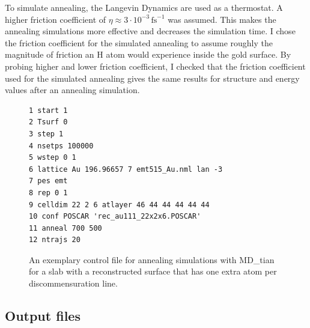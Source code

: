 \documentclass[twoside, 11pt, titlepage, captions=nooneline, a4paper, headsepline]{scrbook}%
\newcommand{\9}{\mathrm}
\newcommand{\0}{\,\mathrm}
\begin{document}
To simulate annealing, the Langevin Dynamics are used as a thermostat. A higher friction coefficient of $\eta \approx 3\cdot10^{-3}$\,$\mathrm{fs}^{-1}$ was assumed. This makes the annealing simulations more effective and decreases the simulation time. I chose the friction coefficient for the simulated annealing to assume roughly the magnitude of friction an H atom would experience inside the gold surface. By probing higher and lower friction coefficient, I checked that the friction coefficient used for the simulated annealing gives the same results for structure and energy values after an annealing simulation.

\begin{figure}[b!]
\begin{verbatim}
1 start 1
2 Tsurf 0
3 step 1
4 nsetps 100000
5 wstep 0 1
6 lattice Au 196.96657 7 emt515_Au.nml lan -3
7 pes emt
8 rep 0 1
9 celldim 22 2 6 atlayer 46 44 44 44 44 44
10 conf POSCAR 'rec_au111_22x2x6.POSCAR'
11 anneal 700 500
12 ntrajs 20
\end{verbatim}
\caption{\label{Fig:mxt:anneal}An exemplary control file for annealing simulations with MD\_tian for a slab with a reconstructed surface that has one extra atom per discommensuration line.}
\end{figure}


\subsection{Output files}
\label{Sec:mxt:output}
\end{document}
